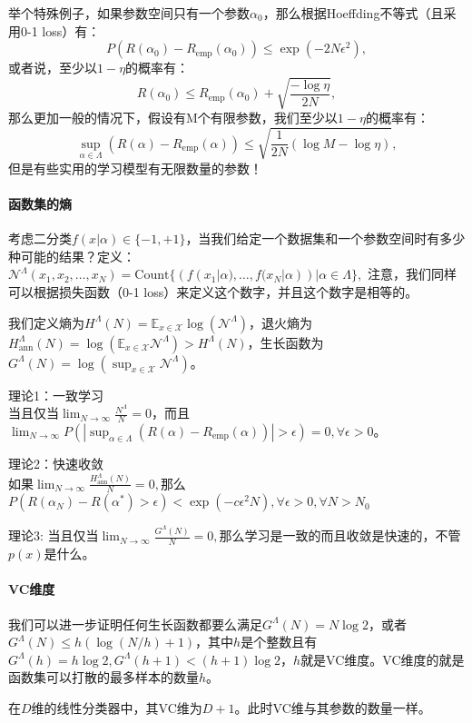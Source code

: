 举个特殊例子，如果参数空间只有一个参数$\alpha_0$，那么根据Hoeffding不等式（且采用0-1 loss）有：
$$P(R(\alpha_0) - R_\text{emp}(\alpha_0)) \le \exp(-2N\epsilon^2),$$
或者说，至少以$1-\eta$的概率有：
$$R(\alpha_0) \le R_\text{emp}(\alpha_0) + \sqrt{\frac{-\log \eta}{2N}},$$
那么更加一般的情况下，假设有M个有限参数，我们至少以$1-\eta$的概率有：
$$
\sup_{\alpha \in \Lambda}(R(\alpha) - R_\text{emp}(\alpha)) \le \sqrt{\frac{1}{2N}(\log M - \log \eta)},
$$
但是有些实用的学习模型有无限数量的参数！

\paragraph{函数集的熵}
考虑二分类$f(x|\alpha) \in \{-1,+1\}$，当我们给定一个数据集和一个参数空间时有多少种可能的结果？定义：
$\mathcal{N}^{\Lambda}(x_1, x_2, \ldots, x_N) = \mathrm{Count}\{(f(x_1|\alpha), \ldots, f(x_N|\alpha)) | \alpha \in \Lambda\},$
注意，我们同样可以根据损失函数（0-1 loss）来定义这个数字，并且这个数字是相等的。

我们定义熵为$H^\Lambda(N) = \mathbb{E}_{x\in \mathcal{X}} \log(\mathcal{N}^\Lambda)$，退火熵为$H_\mathrm{ann}^\Lambda(N) = \log(\mathbb{E}_{x\in \mathcal{X}} \mathcal{N}^\Lambda) > H^\Lambda(N)$，生长函数为$G^\Lambda(N) = \log(\sup_{x\in \mathcal{X}} \mathcal{N}^\Lambda)$。

理论1：一致学习\\
当且仅当$\lim_{N\to \infty} \frac{N^\Lambda}{N} = 0，$而且$\lim_{N\to \infty} P(|\sup_{\alpha \in \Lambda}(R(\alpha) - R_\text{emp}(\alpha))| > \epsilon) = 0, \forall \epsilon > 0$。

理论2：快速收敛\\
如果$\lim_{N\to \infty} \frac{H_\mathrm{ann}^\Lambda(N)}{N} = 0,$那么$P(R(\alpha_N) - R(\alpha^*) > \epsilon) < \exp(-c\epsilon^2N), \forall \epsilon > 0, \forall N > N_0$

理论3:
当且仅当$\lim_{N\to \infty} \frac{G^\Lambda(N)}{N} = 0,$那么学习是一致的而且收敛是快速的，不管$p(x)$是什么。

\paragraph{VC维度}
我们可以进一步证明任何生长函数都要么满足$G^\Lambda(N) = N\log 2$，或者$G^\Lambda(N) \le h(\log (N/h) + 1)$，其中$h$是个整数且有$G^\Lambda(h) = h \log 2, G^\Lambda(h+1) < (h+1)\log 2$，$h$就是VC维度。VC维度的就是函数集可以打散的最多样本的数量$h$。

在$D$维的线性分类器中，其VC维为$D+1$。此时VC维与其参数的数量一样。

